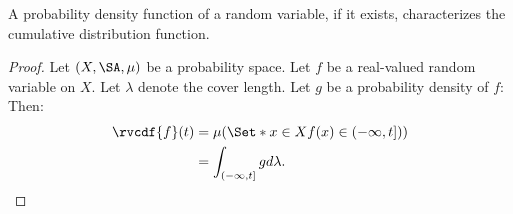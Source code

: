 
\begin{prop}
A probability density
function of a random variable,
if it exists,
characterizes the cumulative
distribution function.

\begin{proof}
Let $(X, \SA, \mu)$ be a
probability space.
Let $f$ be a real-valued
random variable on $X$.
Let $\lambda$ denote
the cover length.
Let $g$ be a probability
density of $f$:
Then:
\[
\begin{aligned}
    \rvcdf{f}(t)
    &= \mu(\Set*{x \in X}{f(x) \in (-\infty, t])}) \\
    &= \int_{(-\infty, t]} gd\lambda.
\end{aligned}
\]
\end{proof}

\end{prop}
\strats
